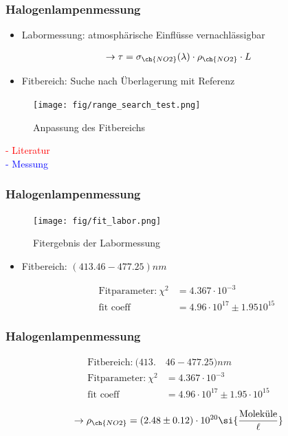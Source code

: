 \documentclass{beamer}
\begin{document}
\begin{frame} 
    \frametitle{Halogenlampenmessung}
    \vspace{-2cm}
	\begin{itemize}
    	\item Labormessung: atmosphärische Einflüsse vernachlässigbar
	\end{itemize}
	\begin{align}
	 	\to \tau = \sigma_{\ch{NO2}}(\lambda) \cdot \rho_{\ch{NO2}} \cdot L
	\end{align}
	
    \begin{itemize}
    	\item Fitbereich: Suche nach Überlagerung mit  Referenz
	\end{itemize}

	\begin{figure}[h]
		\texttt{[image: fig/range\_search\_test.png]}
        \caption{Anpassung des Fitbereichs}
	\end{figure}
    \vspace{-4.5cm}
    \hspace{8.5cm}
    \begin{minipage}[t]{\linewidth}
        \textcolor{red}{- Literatur}\\
        \textcolor{blue}{- Messung}
\end{minipage}
\end{frame} 


\begin{frame}
	\frametitle{Halogenlampenmessung}
     \begin{figure}[h]
    	\texttt{[image: fig/fit\_labor.png]}
    	\caption{Fitergebnis der  Labormessung}
    \end{figure}

    \begin{itemize} 
    	\item Fitbereich: $(413.46 - 477.25) \si{nm}$
    	
    		\begin{align}
    		   \text{Fitparameter:}\ \chi^2 &= 4.367 \cdot 10^{-3}\\
    		   \text{fit coeff} &= 4.96 \cdot 10^{17} \pm 1.95 10^{15}
    		\end{align}
    		
    \end{itemize}
\end{frame} 

\begin{frame}
	\frametitle{Halogenlampenmessung}
	\begin{align}
		\text{Fitbereich:}\ (413.&46 - 477.25) \si{nm}\\
		\text{Fitparameter:}\ \chi^2 &= 4.367 \cdot 10^{-3}\\
		\text{fit coeff} &= 4.96 \cdot 10^{17} \pm 1.95 \cdot 10^{15}
	\end{align}
	
	\begin{align}    
		\to \rho_{\ch{NO2}} = (2.48 \pm 0.12) \cdot 10^{20} \si{\frac{\text{Moleküle}}{\ell}}
	\end{align}
\end{frame}
\end{document}

